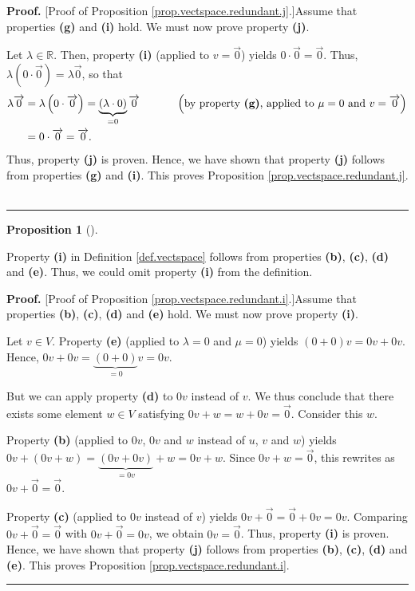 \documentclass[numbers=enddot,12pt,final,onecolumn,notitlepage]{scrartcl}%
\theoremstyle{definition}
\newtheorem{prop}[theo]{Proposition}
\newenvironment{proposition}[1][]
{\begin{prop}[#1]\begin{leftbar}}
{\end{leftbar}\end{prop}}
\newenvironment{proof}[1][Proof]{\noindent\textbf{#1.} }{\ \rule{0.5em}{0.5em}}
\begin{document}
\begin{proof}
[Proof of Proposition \ref{prop.vectspace.redundant.j}.]Assume that properties
\textbf{(g)} and \textbf{(i)} hold. We must now prove property \textbf{(j)}.

Let $\lambda\in\mathbb{R}$. Then, property \textbf{(i)} (applied to
$v=\overrightarrow{0}$) yields $0\cdot\overrightarrow{0}=\overrightarrow{0}$.
Thus, $\lambda\left(  0\cdot\overrightarrow{0}\right)  =\lambda
\overrightarrow{0}$, so that%
\begin{align*}
\lambda\overrightarrow{0}  &  =\lambda\left(  0\cdot\overrightarrow{0}\right)
=\underbrace{\left(  \lambda\cdot0\right)  }_{=0}\overrightarrow{0}%
\ \ \ \ \ \ \ \ \ \ \left(  \text{by property \textbf{(g)}, applied to }%
\mu=0\text{ and }v=\overrightarrow{0}\right) \\
&  =0\cdot\overrightarrow{0}=\overrightarrow{0}.
\end{align*}
Thus, property \textbf{(j)} is proven. Hence, we have shown that property
\textbf{(j)} follows from properties \textbf{(g)} and \textbf{(i)}. This
proves Proposition \ref{prop.vectspace.redundant.j}.
\end{proof}

\begin{proposition}
\label{prop.vectspace.redundant.i}Property \textbf{(i)} in Definition
\ref{def.vectspace} follows from properties \textbf{(b)}, \textbf{(c)},
\textbf{(d)} and \textbf{(e)}. Thus, we could omit property \textbf{(i)} from
the definition.
\end{proposition}

\begin{proof}
[Proof of Proposition \ref{prop.vectspace.redundant.i}.]Assume that properties
\textbf{(b)}, \textbf{(c)}, \textbf{(d)} and \textbf{(e)} hold. We must now
prove property \textbf{(i)}.

Let $v\in V$. Property \textbf{(e)} (applied to $\lambda=0$ and $\mu=0$)
yields $\left(  0+0\right)  v=0v+0v$. Hence, $0v+0v=\underbrace{\left(
0+0\right)  }_{=0}v=0v$.

But we can apply property \textbf{(d)} to $0v$ instead of $v$. We thus
conclude that there exists some element $w\in V$ satisfying
$0v+w=w+0v=\overrightarrow{0}$. Consider this $w$.

Property \textbf{(b)} (applied to $0v$, $0v$ and $w$ instead of $u$, $v$ and
$w$) yields $0v+\left(  0v+w\right)  =\underbrace{\left(  0v+0v\right)
}_{=0v}+w=0v+w$. Since $0v+w=\overrightarrow{0}$, this rewrites as
$0v+\overrightarrow{0}=\overrightarrow{0}$.

Property \textbf{(c)} (applied to $0v$ instead of $v$) yields
$0v+\overrightarrow{0}=\overrightarrow{0}+0v=0v$. Comparing
$0v+\overrightarrow{0}=\overrightarrow{0}$ with $0v+\overrightarrow{0}=0v$, we
obtain $0v=\overrightarrow{0}$. Thus, property \textbf{(i)} is proven. Hence,
we have shown that property \textbf{(j)} follows from properties \textbf{(b)},
\textbf{(c)}, \textbf{(d)} and \textbf{(e)}. This proves Proposition
\ref{prop.vectspace.redundant.i}.
\end{proof}
\end{document}
